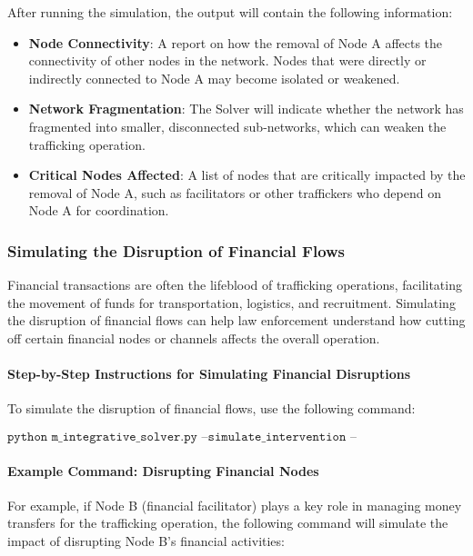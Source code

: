 \documentclass[%
 preprint, linenumbers,
 amsmath,amssymb,
 aps, physrev,
]{revtex4-2}
\begin{document}
After running the simulation, the output will contain the following information:
\begin{itemize}
    \item \textbf{Node Connectivity}: A report on how the removal of Node A affects the connectivity of other nodes in the network. Nodes that were directly or indirectly connected to Node A may become isolated or weakened.
    \item \textbf{Network Fragmentation}: The Solver will indicate whether the network has fragmented into smaller, disconnected sub-networks, which can weaken the trafficking operation.
    \item \textbf{Critical Nodes Affected}: A list of nodes that are critically impacted by the removal of Node A, such as facilitators or other traffickers who depend on Node A for coordination.
\end{itemize}

\subsubsection{Simulating the Disruption of Financial Flows}

Financial transactions are often the lifeblood of trafficking operations, facilitating the movement of funds for transportation, logistics, and recruitment. Simulating the disruption of financial flows can help law enforcement understand how cutting off certain financial nodes or channels affects the overall operation.

\paragraph{Step-by-Step Instructions for Simulating Financial Disruptions}

To simulate the disruption of financial flows, use the following command:

\[
\texttt{python m\_integrative\_solver.py --simulate\_intervention --disrupt\_financial --node\_id [financial facilitator ID]}
\]

\paragraph{Example Command: Disrupting Financial Nodes}

For example, if Node B (financial facilitator) plays a key role in managing money transfers for the trafficking operation, the following command will simulate the impact of disrupting Node B’s financial activities:
\end{document}
